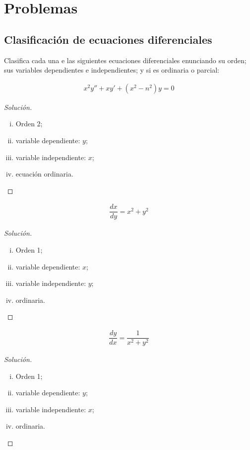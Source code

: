 \section{Problemas}

\subsection{Clasificación de ecuaciones diferenciales}

\begin{resuelto}
	Clasifica cada una e las siguientes ecuaciones diferenciales enunciando su orden; sus variables dependientes e independientes; y si es ordinaria o parcial:
\end{resuelto}


\begin{align*}
	x^2y''+xy'+\left(x^2-n^2\right)y = 0
\end{align*}

\begin{proof}[Solución]
	\begin{enumerate}[(i)]
		\item Orden 2;
		\item variable dependiente: $ y $;
		\item variable independiente: $ x $;
		\item ecuación ordinaria.
	\end{enumerate}
\end{proof}


\begin{align*}
	\dfrac{dx}{dy}= x^{2}+y^{2}
\end{align*}
\begin{proof}[Solución]
	\begin{enumerate}[(i)]
		\item Orden 1;
		\item variable dependiente: $ x $;
		\item variable independiente: $ y $;
		\item ordinaria.
	\end{enumerate}
\end{proof}


\begin{align*}
	\dfrac{dy}{dx}= \dfrac{1}{x^{2}+y^{2}}
\end{align*}
\begin{proof}[Solución]
	\begin{enumerate}[(i)]
		\item Orden 1;
		\item variable dependiente: $ y $;
		\item variable independiente: $ x $;
		\item ordinaria.
	\end{enumerate}
\end{proof}

